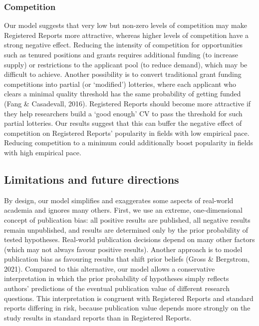 \documentclass[
  british,
  a4paper,
  ,man,mask,floatsintext]{apa6}
\begin{document}
\par\vspace{0.4\baselineskip}

\subsubsection{Competition}\label{competition-1}

Our model suggests that very low but non-zero levels of competition may make Registered Reports more attractive, whereas higher levels of competition have a strong negative effect.
Reducing the intensity of competition for opportunities such as tenured positions and grants requires additional funding (to increase supply) or restrictions to the applicant pool (to reduce demand), which may be difficult to achieve.
Another possibility is to convert traditional grant funding competitions into partial (or `modified') lotteries, where each applicant who clears a minimal quality threshold has the same probability of getting funded (Fang \& Casadevall, 2016).
Registered Reports should become more attractive if they help researchers build a `good enough' CV to pass the threshold for such partial lotteries.
Our results suggest that this can buffer the negative effect of competition on Registered Reports' popularity in fields with low empirical pace.
Reducing competition to a minimum could additionally boost popularity in fields with high empirical pace.

\subsection{Limitations and future directions}\label{limitations-and-future-directions}

By design, our model simplifies and exaggerates some aspects of real-world academia and ignores many others.
First, we use an extreme, one-dimensional concept of publication bias: all positive results are published, all negative results remain unpublished, and results are determined only by the prior probability of tested hypotheses.
Real-world publication decisions depend on many other factors (which may not always favour positive results).
Another approach is to model publication bias as favouring results that shift prior beliefs (Gross \& Bergstrom, 2021).
Compared to this alternative, our model allows a conservative interpretation in which the prior probability of hypotheses simply reflects authors' predictions of the eventual publication value of different research questions.
This interpretation is congruent with Registered Reports and standard reports differing in risk, because publication value depends more strongly on the study results in standard reports than in Registered Reports.
\end{document}
